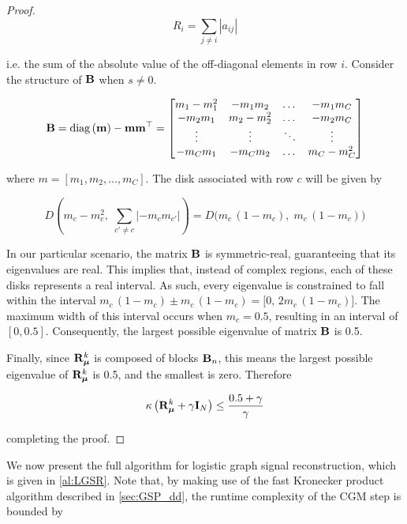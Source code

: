 \begin{proof}
    \begin{equation*}
        R_i = \sum_{j \neq i} |a_{ij}|
    \end{equation*}
    
    i.e. the sum of the absolute value of the off-diagonal elements in row $i$. Consider the structure of $\mathbf{B}$ when $s \neq 0$. 

    \begin{equation*}
        \mathbf{B} = \text{\textup{diag}}\left(\mathbf{m}\right) - \mathbf{m} \mathbf{m}^\top = \begin{bmatrix}
            m_1 - m_1^2 & -m_1 m_2 & \dots & - m_1 m_C \\
            - m_2 m_1 & m_2 - m_2^2 & \dots & -m_2 m_C \\
            \vdots & \vdots & \ddots & \vdots \\
            -m_C m_1 & -m_C m_2 & \dots &m_C- m_C^2
        \end{bmatrix}
    \end{equation*}
    
    where $m = [m_1, m_2, ..., m_C]$. The disk associated with row $c$ will be given by

    $$
    D\left(m_c - m_c^2, \; \sum_{c' \neq c} |-m_c m_{c'}|\right) = D\Big(m_c\,(1 - m_c), \; m_c\,(1 - m_c)\Big)
    $$
    
    In our particular scenario, the matrix $\mathbf{B}$ is symmetric-real, guaranteeing that its eigenvalues are real. This implies that, instead of complex regions, each of these disks represents a real interval. As such, every eigenvalue is constrained to fall within the interval $m_c\,(1 - m_c) \pm m_c\,(1 - m_c) = \big[0, \, 2 m_c\,(1 - m_c)\big]$. The maximum width of this interval occurs when $m_c = 0.5$, resulting in an interval of $[0, 0.5]$. Consequently, the largest possible eigenvalue of matrix $\mathbf{B}$ is 0.5.

    Finally, since $\mathbf{R}_{\boldsymbol{\mu}}^k$ is composed of blocks $\mathbf{B}_n$, this means the largest possible eigenvalue of $\mathbf{R}_{\boldsymbol{\mu}}^k$ is 0.5, and the smallest is zero. Therefore

    \begin{equation*}
        \kappa\left( \mathbf{R}_{\boldsymbol{\mu}}^k + \gamma \mathbf{I}_N\right) \leq \frac{0.5 + \gamma}{\gamma}
    \end{equation*}

    completing the proof.

\end{proof}

We now present the full algorithm for logistic graph signal reconstruction, which is given in \cref{al:LGSR}. Note that, by making use of the fast Kronecker product algorithm described in \cref{sec:GSP_dd}, the runtime complexity of the CGM step is bounded by 

